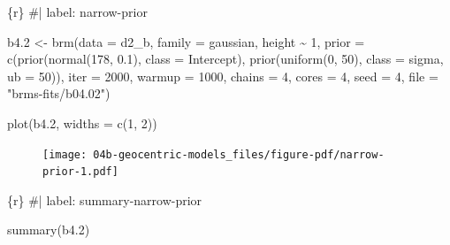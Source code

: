 \documentclass[
  letterpaper,
  DIV=11,
  numbers=noendperiod]{scrreprt}
\newenvironment{Shaded}{\begin{snugshade}}{\end{snugshade}}
\newcommand{\AttributeTok}[1]{\textcolor[rgb]{0.40,0.45,0.13}{#1}}
\newcommand{\CommentTok}[1]{\textcolor[rgb]{0.37,0.37,0.37}{#1}}
\newcommand{\DecValTok}[1]{\textcolor[rgb]{0.68,0.00,0.00}{#1}}
\newcommand{\FloatTok}[1]{\textcolor[rgb]{0.68,0.00,0.00}{#1}}
\newcommand{\FunctionTok}[1]{\textcolor[rgb]{0.28,0.35,0.67}{#1}}
\newcommand{\InformationTok}[1]{\textcolor[rgb]{0.37,0.37,0.37}{#1}}
\newcommand{\NormalTok}[1]{\textcolor[rgb]{0.00,0.23,0.31}{#1}}
\newcommand{\OtherTok}[1]{\textcolor[rgb]{0.00,0.23,0.31}{#1}}
\newcommand{\SpecialCharTok}[1]{\textcolor[rgb]{0.37,0.37,0.37}{#1}}
\newcommand{\StringTok}[1]{\textcolor[rgb]{0.13,0.47,0.30}{#1}}
\begin{document}
\begin{Shaded}
\begin{Highlighting}[]
\InformationTok{\textasciigrave{}\textasciigrave{}\textasciigrave{}\{r\}}
\CommentTok{\#| label: narrow{-}prior}

\NormalTok{b4}\FloatTok{.2} \OtherTok{\textless{}{-}} 
  \FunctionTok{brm}\NormalTok{(}\AttributeTok{data =}\NormalTok{ d2\_b, }
      \AttributeTok{family =}\NormalTok{ gaussian,}
\NormalTok{      height }\SpecialCharTok{\textasciitilde{}} \DecValTok{1}\NormalTok{,}
      \AttributeTok{prior =} \FunctionTok{c}\NormalTok{(}\FunctionTok{prior}\NormalTok{(}\FunctionTok{normal}\NormalTok{(}\DecValTok{178}\NormalTok{, }\FloatTok{0.1}\NormalTok{), }\AttributeTok{class =}\NormalTok{ Intercept),}
                \FunctionTok{prior}\NormalTok{(}\FunctionTok{uniform}\NormalTok{(}\DecValTok{0}\NormalTok{, }\DecValTok{50}\NormalTok{), }\AttributeTok{class =}\NormalTok{ sigma, }\AttributeTok{ub =} \DecValTok{50}\NormalTok{)),}
      \AttributeTok{iter =} \DecValTok{2000}\NormalTok{, }\AttributeTok{warmup =} \DecValTok{1000}\NormalTok{, }\AttributeTok{chains =} \DecValTok{4}\NormalTok{, }\AttributeTok{cores =} \DecValTok{4}\NormalTok{,}
      \AttributeTok{seed =} \DecValTok{4}\NormalTok{,}
      \AttributeTok{file =} \StringTok{"brms{-}fits/b04.02"}\NormalTok{)}

\FunctionTok{plot}\NormalTok{(b4}\FloatTok{.2}\NormalTok{, }\AttributeTok{widths =} \FunctionTok{c}\NormalTok{(}\DecValTok{1}\NormalTok{, }\DecValTok{2}\NormalTok{))}
\InformationTok{\textasciigrave{}\textasciigrave{}\textasciigrave{}}
\end{Highlighting}
\end{Shaded}

\begin{figure}[H]

{\centering \texttt{[image: 04b-geocentric-models\_files/figure-pdf/narrow-prior-1.pdf]}

}

\end{figure}

\begin{Shaded}
\begin{Highlighting}[]
\InformationTok{\textasciigrave{}\textasciigrave{}\textasciigrave{}\{r\}}
\CommentTok{\#| label: summary{-}narrow{-}prior}

\FunctionTok{summary}\NormalTok{(b4}\FloatTok{.2}\NormalTok{)}
\InformationTok{\textasciigrave{}\textasciigrave{}\textasciigrave{}}
\end{Highlighting}
\end{Shaded}
\end{document}
